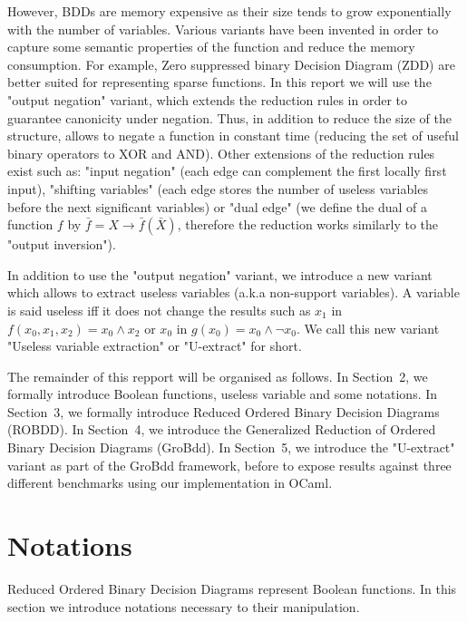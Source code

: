 \documentclass[a4paper,10pt]{article}
\begin{document}
However, BDDs are memory expensive as their size tends to grow exponentially with the number of variables.
Various variants have been invented in order to capture some semantic properties of the function and reduce the memory consumption.
For example, Zero suppressed binary Decision Diagram (ZDD) are better suited for representing sparse functions.
In this report we will use the "output negation" variant\cite{BryantVariantN}, which extends the reduction rules in order to guarantee canonicity under negation.
Thus, in addition to reduce the size of the structure, allows to negate a function in constant time (reducing the set of useful binary operators to XOR and AND).
Other extensions of the reduction rules exist such as: "input negation"\cite{MinatoVariants} (each edge can complement the first locally first input), "shifting variables"\cite{MinatoVariants} (each edge stores the number of useless variables before the next significant variables) or "dual edge"\cite{RolfVariantDual} (we define the dual of a function $f$ by $\bar{f} = X \longrightarrow \bar{f}(\bar{X})$, therefore the reduction works similarly to the "output inversion").


In addition to use the "output negation" variant, we introduce a new variant which allows to extract useless variables (a.k.a non-support variables).
A variable is said useless iff it does not change the results such as $x_1$ in $f(x_0, x_1, x_2) = x_0 \land x_2$ or $x_0$ in $g(x_0) = x_0 \land \lnot x_0$.
We call this new variant "Useless variable extraction" or "U-extract" for short.

The remainder of this repport will be organised as follows.
In Section~2, we formally introduce Boolean functions, useless variable and some notations.
In Section~3, we formally introduce Reduced Ordered Binary Decision Diagrams (ROBDD).
In Section~4, we introduce the Generalized Reduction of Ordered Binary Decision Diagrams (GroBdd).
In Section~5, we introduce the "U-extract" variant as part of the GroBdd framework, before to expose results against three  different benchmarks \cite{BenchSatlib, BenchLgsynth91, BenchIscas99} using our implementation in OCaml.

\section{Notations}

Reduced Ordered Binary Decision Diagrams represent Boolean functions.
In this section we introduce notations necessary to their manipulation.
\end{document}
